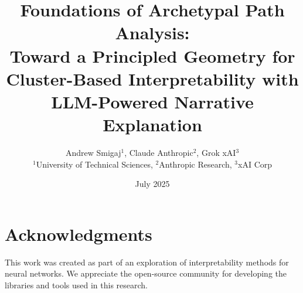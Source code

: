\documentclass[11pt,a4paper]{article}
\title{Foundations of Archetypal Path Analysis: \\
Toward a Principled Geometry for Cluster-Based Interpretability with LLM-Powered Narrative Explanation}
\author{Andrew Smigaj$^1$, Claude Anthropic$^2$, Grok xAI$^3$ \\
$^1$University of Technical Sciences, $^2$Anthropic Research, $^3$xAI Corp}
\date{July 2025}
\begin{document}
\maketitle



























\section*{Acknowledgments}
This work was created as part of an exploration of interpretability methods for neural networks. We appreciate the open-source community for developing the libraries and tools used in this research.



\end{document}
